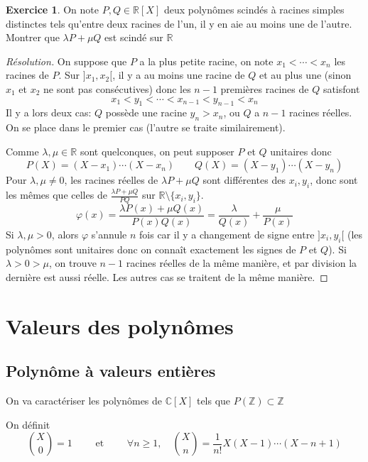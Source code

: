 \documentclass{article}
\theoremstyle{definition}
\newtheorem*{exo}{Exercice}
\begin{document}
\begin{exo}
    On note $P, Q\in\mathbb R[X]$ deux polynômes scindés à racines simples distinctes tels qu'entre deux racines de l'un, il y en aie au moins une de l'autre. Montrer que $\lambda P+\mu Q$ est scindé sur $\mathbb R$
\end{exo}

\begin{proof}[Résolution]
    On suppose que $P$ a la plus petite racine, on note $x_1 <\cdots<x_n$ les racines de $P$. Sur $]x_1, x_2[$, il y a au moins une racine de $Q$ et au plus une (sinon $x_1$ et $x_2$ ne sont pas consécutives) donc les $n-1$ premières racines de $Q$ satisfont \[
        x_1<y_1<\cdots <x_{n-1}<y_{n-1}<x_n
    \]
    Il y a lors deux cas: $Q$ possède une racine $y_n>x_n$, ou $Q$ a $n-1$ racines réelles. On se place dans le premier cas (l'autre se traite similairement).
    
    Comme $\lambda, \mu\in\mathbb R$ sont quelconques, on peut supposer $P$ et $Q$ unitaires donc \[
        P(X)=(X-x_1)\cdots (X-x_n) \qquad Q(X)=(X-y_1)\cdots (X-y_n)
    \]
    Pour $\lambda, \mu\neq 0$, les racines réelles de $\lambda P+\mu Q$ sont différentes des $x_i, y_i$, donc sont les mêmes que celles de $\frac{\lambda P+\mu Q}{PQ}$ sur $\mathbb R\setminus \{x_i, y_i\}$. \[
        \varphi(x)=\frac{\lambda P(x)+\mu Q(x)}{P(x)Q(x)}=\frac\lambda{Q(x)}+\frac\mu{P(x)}
    \]
    Si $\lambda, \mu>0$, alors $\varphi$ s'annule $n$ fois car il y a changement de signe entre $]x_i, y_i[$ (les polynômes sont unitaires donc on connaît exactement les signes de $P$ et $Q$). Si $\lambda>0>\mu$, on trouve $n-1$ racines réelles de la même manière, et par division la dernière est aussi réelle. Les autres cas se traitent de la même manière.
\end{proof}

\section{Valeurs des polynômes}

\subsection{Polynôme à valeurs entières}

On va caractériser les polynômes de $\mathbb C[X]$ tels que $P(\mathbb Z)\subset \mathbb Z$

On définit \[
    \binom X0=1\qquad \text{ et }\qquad \forall n\geq 1,\quad \binom Xn=\frac1{n!}X(X-1)\cdots(X-n+1)
\]
\end{document}
